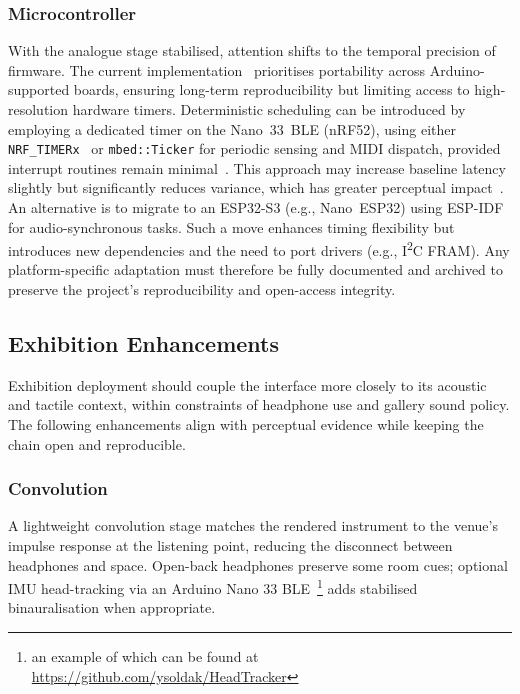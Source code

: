 \subsubsection{Microcontroller}

With the analogue stage stabilised, attention shifts to the temporal precision of firmware. The current implementation~\cite{hamilton_firmware_2025} prioritises portability across Arduino-supported boards, ensuring long-term reproducibility but limiting access to high-resolution hardware timers. Deterministic scheduling can be introduced by employing a dedicated timer on the Nano~33~BLE (nRF52), using either \texttt{NRF\_TIMERx}~\cite{nordic_timer_2023,nordic_timer_2025} or \texttt{mbed::Ticker} for periodic sensing and MIDI dispatch, provided interrupt routines remain minimal~\cite{klingensmith_using_2019}. This approach may increase baseline latency slightly but significantly reduces variance, which has greater perceptual impact~\cite{jack_effect_2016}. An alternative is to migrate to an ESP32-S3 (e.g., Nano~ESP32) using ESP-IDF for audio-synchronous tasks. Such a move enhances timing flexibility but introduces new dependencies and the need to port drivers (e.g., I\textsuperscript{2}C FRAM). Any platform-specific adaptation must therefore be fully documented and archived to preserve the project’s reproducibility and open-access integrity.


\subsection{Exhibition Enhancements}

Exhibition deployment should couple the interface more closely to its acoustic and tactile context, within constraints of headphone use and gallery sound policy. The following enhancements align with perceptual evidence while keeping the chain open and reproducible.

\subsubsection{Convolution}

A lightweight convolution stage matches the rendered instrument to the venue’s impulse response at the listening point, reducing the disconnect between headphones and space. Open-back headphones preserve some room cues; optional IMU head-tracking via an Arduino Nano 33 BLE~\cite{franvcek_performance_2023}\footnote{an example of which can be found at
    \url{https://github.com/ysoldak/HeadTracker}} adds stabilised binauralisation when appropriate.

